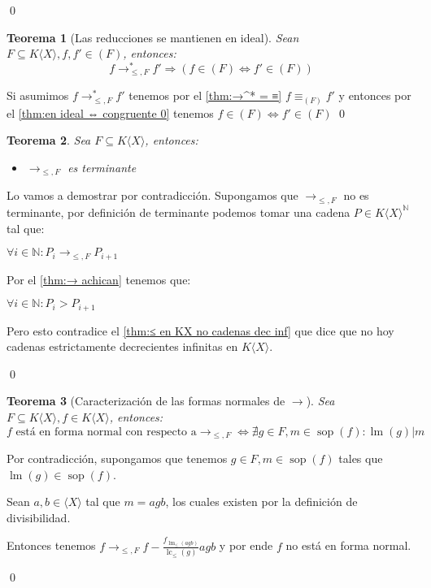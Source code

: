\documentclass{report}
\theoremstyle{customstyle}
\newtheorem{theorem}{Teorema}[chapter]
\renewenvironment{proof}[1][\proofname]{{\bfseries #1: }}{\qed} %
\theoremstyle{factstyle}
\DeclareMathOperator{\sop}{sop}
\DeclareMathOperator{\lm}{lm}
\DeclareMathOperator{\lc}{lc}
\begin{document}
\begin{proof}
\begin{description}
  \end{description}
\end{proof}

\begin{theorem}[Las reducciones se mantienen en ideal]\label{thm:→ mantiene pertenencia a ideal}
  Sean $F ⊆ K⟨X⟩, f, f' ∈ (F)$, entonces:
  \[ f →^*_{≤, F} f' ⇒ (f ∈ (F) ⇔ f' ∈ (F)) \]
\end{theorem}
\begin{proof}
  Si asumimos $f →^*_{≤, F} f'$ tenemos por el \cref{thm:→^* = ≡} $f ≡_{(F)} f'$ y entonces por el \cref{thm:en ideal ⇔ congruente 0} tenemos $f ∈ (F) ⇔ f' ∈ (F)$
\end{proof}

\begin{theorem}
  Sea $F ⊆ K⟨X⟩$, entonces:
  \begin{itemize}
    \item $→_{≤, F}$ es terminante
  \end{itemize}
\end{theorem}
\begin{proof}
  Lo vamos a demostrar por contradicción. Supongamos que $→_{≤, F}$ no es terminante, por definición de terminante podemos tomar una cadena $P ∈ K⟨X⟩^ℕ$ tal que:

  $∀i ∈ ℕ : P_i →_{≤, F} P_{i+1}$

  Por el \cref{thm:→ achican} tenemos que:

  $∀i ∈ ℕ : P_i > P_{i+1}$

  Pero esto contradice el \cref{thm:≤ en KX no cadenas dec inf} que dice que no hoy cadenas estrictamente decrecientes infinitas en $K⟨X⟩$.

\end{proof}

\begin{theorem}[Caracterización de las formas normales de $→$]
  Sea $F ⊆ K⟨X⟩, f ∈ K⟨X⟩$, entonces: %
  \[ f\text{ está en forma normal con respecto a} →_{≤, F} ⇔ ∄g ∈ F, m ∈ \sop(f) : \lm(g) | m \]
\end{theorem}
\begin{proof}
  Por contradicción, supongamos que tenemos $g ∈ F, m ∈ \sop(f)$ tales que $\lm(g) ∈ \sop(f)$.

  Sean $a, b ∈ ⟨X⟩$ tal que $m = agb$, los cuales existen por la definición de divisibilidad.

  Entonces tenemos $f →_{≤, F} f - \frac{f_{\lm_≤(agb)}}{\lc_≤(g)}agb$ y por ende $f$ no está en forma normal.

\end{proof}
\end{document}
